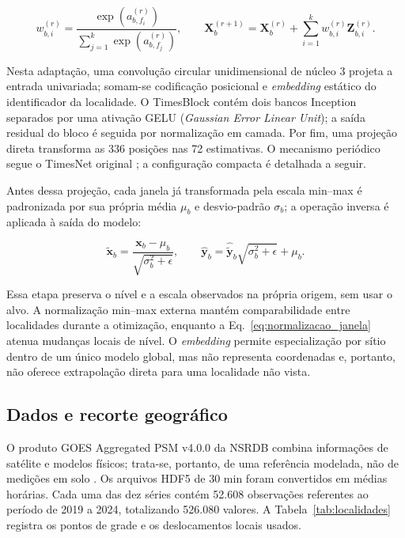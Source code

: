 \documentclass[10pt,conference,a4paper]{IEEEtran}
\begin{document}
\begin{equation}
 w_{b,i}^{(r)}=\frac{\exp(a_{b,f_i}^{(r)})}
 {\sum_{j=1}^{k}\exp(a_{b,f_j}^{(r)})},\qquad
 \mathbf X_b^{(r+1)}=\mathbf X_b^{(r)}+
 \sum_{i=1}^{k}w_{b,i}^{(r)}\mathbf Z_{b,i}^{(r)}.
 \label{eq:timesnet}
\end{equation}

Nesta adaptação, uma convolução circular unidimensional de núcleo 3 projeta a
entrada univariada; somam-se codificação posicional e \textit{embedding}
estático do identificador da localidade. O TimesBlock contém dois bancos
Inception separados por uma ativação GELU (\textit{Gaussian Error Linear
Unit}); a saída residual do bloco é seguida por normalização em camada. Por
fim, uma projeção direta transforma as 336 posições nas 72 estimativas. O
mecanismo periódico segue o TimesNet original \cite{wu2023}; a configuração
compacta é detalhada a seguir.

Antes dessa projeção, cada janela já transformada pela escala min--max é
padronizada por sua própria média $\mu_b$ e desvio-padrão $\sigma_b$; a
operação inversa é aplicada à saída do modelo:

\begin{equation}
 \widetilde{\mathbf x}_b=
 \frac{\mathbf x_b-\mu_b}{\sqrt{\sigma_b^2+\epsilon}},\qquad
 \widehat{\mathbf y}_b=
 \widehat{\widetilde{\mathbf y}}_b\sqrt{\sigma_b^2+\epsilon}+\mu_b.
 \label{eq:normalizacao_janela}
\end{equation}

\noindent Essa etapa preserva o nível e a escala observados na própria origem,
sem usar o alvo. A normalização min--max externa mantém comparabilidade entre
localidades durante a otimização, enquanto a Eq.~\eqref{eq:normalizacao_janela}
atenua mudanças locais de nível. O \textit{embedding} permite especialização
por sítio dentro de um único modelo global, mas não representa coordenadas e,
portanto, não oferece extrapolação direta para uma localidade não vista.

\subsection{Dados e recorte geográfico}

O produto GOES Aggregated PSM v4.0.0 da NSRDB combina informações de satélite
e modelos físicos; trata-se, portanto, de uma referência modelada, não de
medições em solo
\cite{sengupta2018,nlr2026}. Os arquivos HDF5 de 30 min foram convertidos em
médias horárias. Cada uma das dez séries contém 52.608 observações referentes
ao período de 2019 a 2024, totalizando 526.080 valores. A
Tabela~\ref{tab:localidades} registra
os pontos de grade e os deslocamentos locais usados.
\end{document}

